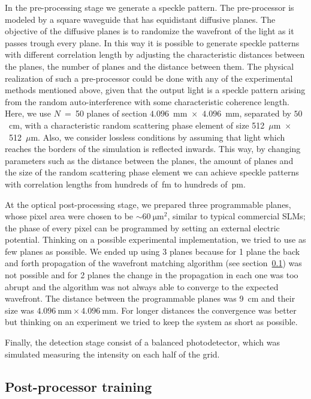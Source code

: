 \documentclass{optica-article}
\begin{document}
In the pre-processing stage we generate a speckle pattern. The pre-processor is modeled by a square waveguide that has equidistant diffusive planes. The objective of the diffusive planes is to randomize the wavefront of the light as it passes trough every plane. In this way it is possible to generate speckle patterns with different correlation length by adjusting the characteristic distances between the planes, the number of planes and the distance between them. The physical realization of such a pre-processor could be done with any of the experimental methods mentioned above, given that the output light is a speckle pattern arising from the random auto-interference with some characteristic coherence length. Here, we use $N$~=~50 planes of section $4.096$~mm~$\times$~$4.096$~mm, separated by $50$~cm, with a characteristic random scattering phase element of size 512~$\mu$m~$\times$~512~$\mu$m. Also, we consider lossless conditions by assuming that light which reaches the borders of the simulation is reflected inwards. This way, by changing parameters such as the distance between the planes, the amount of planes and the size of the random scattering phase element we can achieve speckle patterns with correlation lengths from hundreds of~fm to hundreds of~pm.

At the optical post-processing stage, we prepared three programmable planes, whose pixel area were chosen to be $\sim60~\mathrm{\mu m}^2$, similar to typical commercial SLMs; the phase of every pixel can be programmed by setting an external electric potential. Thinking on a possible experimental implementation, we tried to use as few planes as possible. We ended up using 3 planes because for 1 plane the back and forth propagation of the wavefront matching algorithm (see section~\ref{sec: PPT}) was not possible and for 2 planes the change in the propagation in each one was too abrupt and the algorithm was not always able to converge to the expected wavefront. The distance between the programmable planes was 9~cm and their size was $4.096~\mathrm{mm} \times 4.096~\mathrm{mm}$. For longer distances the convergence was better but thinking on an experiment we tried to keep the system as short as possible. 

Finally, the detection stage consist of a balanced photodetector, which was simulated measuring the intensity on each half of the grid.

\subsection{Post-processor training}\label{sec: PPT}
\end{document}
